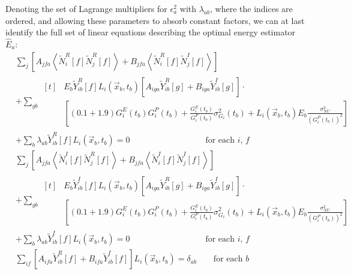 Denoting the set of Lagrange multipliers for $\epsilon^2_a$ with $\lambda_{ab}$, where the indices are ordered, and allowing these parameters to absorb constant factors, we can at last identify the full set of linear equations describing the optimal energy estimator $\widehat{E}_a$:
\begin{subequations}\begin{align}
&\sum_j \left[ A_{jfa} \left<\widetilde{N}_i^R[f]\widetilde{N}_j^R[f]\right> + B_{jfa} \left<\widetilde{N}_i^R[f]\widetilde{N}_j^I[f]\right>\right]\nonumber\\
&+ \sum_{gb} \begin{aligned}[t]
  & E_b\widetilde{Y}_{ib}^R[f] L_i(\vec{x}_b,t_b)\left[A_{iga} \widetilde{Y}_{ib}^R[g] + B_{iga} \widetilde{Y}_{ib}^I[g]\right] \cdot \\
  & \left[ (0.1 + 1.9) G^E_i(t_b) G^P_i(t_b) + \frac{G^E_i(t_b)}{G^P_i(t_b)} \sigma^2_{G_i}(t_b) + L_i(\vec{x}_b,t_b) E_b \frac{\sigma^2_{NU}}{\left(G^P_i(t_b)\right)^2} \right] \end{aligned} \nonumber \\
&+ \sum_b \lambda_{ab} \widetilde{Y}^R_{ib}[f] L_i(\vec{x}_b,t_b) = 0 \qquad \qquad \qquad \qquad \quad \text{for each $i$, $f$}\\
%
&\sum_j \left[ A_{jfa} \left<\widetilde{N}_i^I[f]\widetilde{N}_j^R[f]\right> + B_{jfa} \left<\widetilde{N}_i^I[f]\widetilde{N}_j^I[f]\right>\right]\nonumber\\
&+ \sum_{gb} \begin{aligned}[t]
  & E_b\widetilde{Y}_{ib}^I[f] L_i(\vec{x}_b,t_b)\left[A_{iga} \widetilde{Y}_{ib}^R[g] + B_{iga} \widetilde{Y}_{ib}^I[g]\right] \cdot \\
  & \left[ (0.1 + 1.9) G^E_i(t_b) G^P_i(t_b) + \frac{G^E_i(t_b)}{G^P_i(t_b)} \sigma^2_{G_i}(t_b) + L_i(\vec{x}_b,t_b) E_b \frac{\sigma^2_{NU}}{\left(G^P_i(t_b)\right)^2} \right] \end{aligned} \nonumber\\
&+ \sum_b \lambda_{ab} \widetilde{Y}^I_{ib}[f] L_i(\vec{x}_b,t_b) = 0 \qquad \qquad \qquad \qquad \quad \text{for each $i$, $f$}\\
%
&\sum_{if}\left[A_{ifa} \widetilde{Y}_{ib}^R[f] + B_{ifa} \widetilde{Y}_{ib}^I[f]\right] L_i(\vec{x}_b,t_b) = \delta_{ab} \qquad \text{for each $b$}
\end{align}\end{subequations}

